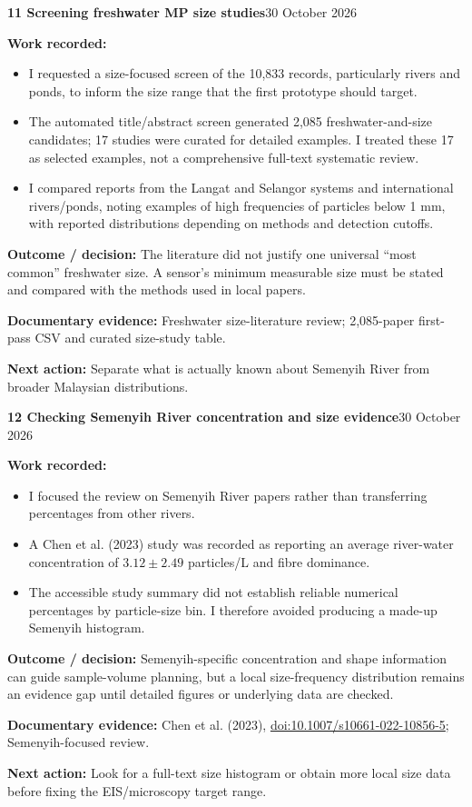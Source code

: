 \documentclass[11pt,a4paper]{article}
\newcommand{\logentry}[3]{%
  \Needspace{13\baselineskip}%
  \vspace{8pt}%
  {\large\bfseries\color{ink}#1 \quad #2}\hfill{\small\color{ink}#3}\par
  \vspace{-3pt}{\color{linecolor}\rule{\linewidth}{.6pt}}\par\vspace{1pt}%
}
\newcommand{\result}[1]{\textbf{Outcome / decision:} #1\par}
\newcommand{\evidence}[1]{\textbf{Documentary evidence:} {\small #1}\par}
\newcommand{\nextstep}[1]{\textbf{Next action:} #1\par}
\begin{document}
\logentry{11}{Screening freshwater MP size studies}{30 October 2026}
\textbf{Work recorded:}
\begin{itemize}
\item I requested a size-focused screen of the 10,833 records, particularly rivers and ponds, to inform the size range that the first prototype should target.
\item The automated title/abstract screen generated 2,085 freshwater-and-size candidates; 17 studies were curated for detailed examples. I treated these 17 as selected examples, not a comprehensive full-text systematic review.
\item I compared reports from the Langat and Selangor systems and international rivers/ponds, noting examples of high frequencies of particles below 1 mm, with reported distributions depending on methods and detection cutoffs.
\end{itemize}
\result{The literature did not justify one universal ``most common'' freshwater size. A sensor's minimum measurable size must be stated and compared with the methods used in local papers.}
\evidence{Freshwater size-literature review; 2,085-paper first-pass CSV and curated size-study table.}
\nextstep{Separate what is actually known about Semenyih River from broader Malaysian distributions.}

\logentry{12}{Checking Semenyih River concentration and size evidence}{30 October 2026}
\textbf{Work recorded:}
\begin{itemize}
\item I focused the review on Semenyih River papers rather than transferring percentages from other rivers.
\item A Chen et al. (2023) study was recorded as reporting an average river-water concentration of $3.12\pm2.49$ particles/L and fibre dominance.
\item The accessible study summary did not establish reliable numerical percentages by particle-size bin. I therefore avoided producing a made-up Semenyih histogram.
\end{itemize}
\result{Semenyih-specific concentration and shape information can guide sample-volume planning, but a local size-frequency distribution remains an evidence gap until detailed figures or underlying data are checked.}
\evidence{Chen et al. (2023), \href{https://doi.org/10.1007/s10661-022-10856-5}{doi:10.1007/s10661-022-10856-5}; Semenyih-focused review.}
\nextstep{Look for a full-text size histogram or obtain more local size data before fixing the EIS/microscopy target range.}
\end{document}
